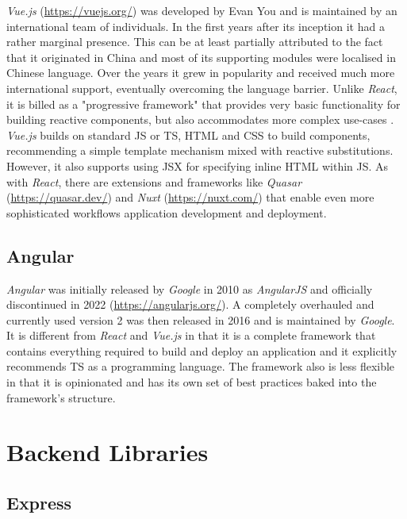 \emph{Vue.js} (\url{https://vuejs.org/}) was developed by Evan You and is maintained by an international team of individuals. In the first years after its inception it had a rather marginal presence. This can be at least partially attributed to the fact that it originated in China and most of its supporting modules were localised in Chinese language. Over the years it grew in popularity and received much more international support, eventually overcoming the language barrier. Unlike \emph{React}, it is billed as a "progressive framework" that provides very basic functionality for building reactive components, but also accommodates more complex use-cases \parencite{vueProgressiveFramework}. \emph{Vue.js} builds on standard \ac{JS} or \ac{TS}, \ac{HTML} and \ac{CSS} to build components, recommending a simple template mechanism mixed with reactive substitutions. However, it also supports using \ac{JSX} for specifying inline \ac{HTML} within \ac{JS}. As with \emph{React}, there are extensions and frameworks like \emph{Quasar} (\url{https://quasar.dev/}) and \emph{Nuxt} (\url{https://nuxt.com/}) that enable even more sophisticated workflows application development and deployment.

\subsection{Angular}

\emph{Angular} was initially released by \emph{Google} in 2010 as \emph{AngularJS}  and officially discontinued in 2022 (\url{https://angularjs.org/}). A completely overhauled and currently used version 2 was then released in 2016 and is maintained by \emph{Google}. It is different from \emph{React} and \emph{Vue.js} in that it is a complete framework that contains everything required to build and deploy an application and it explicitly recommends \ac{TS} as a programming language. The framework also is less flexible in that it is opinionated and has its own set of best practices baked into the framework's structure.




\section{Backend Libraries}

\subsection{Express}

